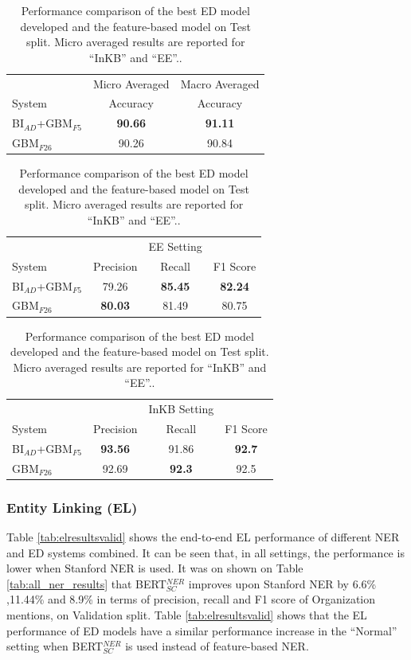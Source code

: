 \documentclass{report}
\theoremstyle{definition}
\theoremstyle{remark}
\begin{document}
\begin{table}
    \centering
    \begin{tabular}{lcc}
    &Micro Averaged & Macro Averaged\\
    System    & Accuracy &Accuracy \\
    \hline
    BI$_{AD}$+GBM$_{F5}$   &\textbf{90.66} & \textbf{91.11}\\
    GBM$_{F26}$ & 90.26&	90.84\\
    \end{tabular}
    
    \vspace{0.5cm}\begin{tabular}{lccc}
    &&EE Setting & \\
    System  & Precision & Recall & F1 Score \\
    \hline
     BI$_{AD}$+GBM$_{F5}$   &79.26 &\textbf{85.45}&\textbf{82.24}\\
    GBM$_{F26}$   & \textbf{80.03}&	81.49&	80.75\\
    \end{tabular}
    
    \vspace{0.5cm}\begin{tabular}{lccc}
    &&InKB Setting & \\
    System  & Precision & Recall & F1 Score \\
    \hline
     BI$_{AD}$+GBM$_{F5}$   &\textbf{93.56}  &91.86 &\textbf{92.7}\\
    GBM$_{F26}$   & 92.69&	\textbf{92.3}&	92.5\\
    \end{tabular}
    		

    \caption{Performance comparison of the best  ED model developed and the feature-based model on Test split. Micro averaged results are reported for ``InKB'' and ``EE''..}
    \label{tab:edresultstest}
\end{table}


\subsubsection{Entity Linking (EL)}
Table \ref{tab:elresultsvalid} shows the end-to-end EL performance of different NER and ED systems combined. It can be seen that, in all settings, the performance is lower when Stanford NER is used. It was on shown on Table \ref{tab:all_ner_results} that BERT$_{SC}^{NER}$ improves upon Stanford NER by 6.6\% ,11.44\% and 8.9\% in terms of precision, recall and F1 score of Organization mentions, on Validation split. Table \ref{tab:elresultsvalid} shows that the EL performance of ED models have a similar performance increase in the ``Normal'' setting when BERT$_{SC}^{NER}$ is used instead of feature-based NER.
\end{document}
